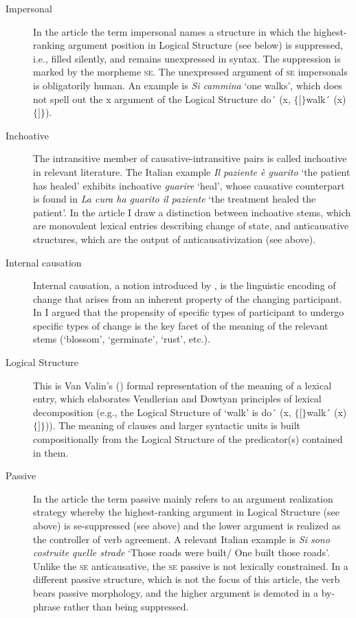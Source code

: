 \documentclass[output=paper,colorlinks,citecolor=brown
]{langscibook}
\begin{document}
\begin{description}
\item[Impersonal] In the article the term impersonal   names a structure in which the highest-ranking argument position in Logical   Structure (see below) is suppressed, i.e., filled silently, and remains   unexpressed in syntax. The suppression is marked by the morpheme \textsc{se}. The unexpressed argument of \textsc{se} impersonals is obligatorily human.  An example is \textit{Si cammina} ‘one   walks’, which does not spell out the x argument of the Logical Structure do´ (x, $\{ [ \}$walk´ (x) $\{] \}$).
\item[Inchoative] The intransitive member of   causative-intransitive pairs is called inchoative in relevant   literature. The Italian example \textit{Il paziente è guarito} ‘the patient has   healed’ exhibits inchoative \textit{guarire} ‘heal’, whose causative   counterpart is found in \textit{La cura ha guarito il paziente} ‘the treatment   healed the patient’. In the article I draw a distinction between inchoative stems,   which are monovalent lexical entries describing change of state, and anticausative   structures, which are the output of anticausativization (see above).
\item[Internal   causation] Internal causation, a notion introduced   by \citet{levin1995unaccusativity}, is the linguistic encoding of change   that arises from an inherent property of the changing participant. In \citet{bentley2023internally} I argued that the propensity of specific types of participant to   undergo specific types of change is the key facet of the meaning of the   relevant stems (‘blossom’, ‘germinate’, ‘rust’, etc.).
\item[Logical   Structure] This is Van Valin's (\citeyear{vanvalin2005exploring,vanvalin2023principles}) formal   representation of the meaning of a lexical entry, which elaborates Vendlerian   and Dowtyan principles of lexical decomposition (e.g., the Logical Structure   of ‘walk’ is do´   (x,   $\{ [ \}$walk´ (x)$\{] \}$)). The meaning of clauses   and larger syntactic units is built compositionally from the Logical   Structure of the predicator(s) contained in them.
\item[Passive] In the article the term passive   mainly refers to an argument realization strategy whereby the highest-ranking   argument in Logical Structure (see above) is se-suppressed   (see above) and the lower argument is realized as the controller of verb   agreement. A relevant Italian example is \textit{Si sono costruite quelle strade}   ‘Those roads were built/ One built those roads’. Unlike the \textsc{se} anticausative, the \textsc{se} passive is not lexically   constrained. In a different passive structure, which is not the focus of this   article, the verb bears passive morphology, and the higher argument is   demoted in a by-phrase rather than being suppressed.

\end{description}
\end{document}
